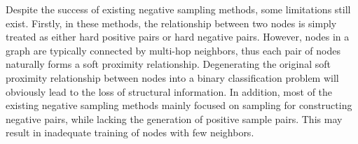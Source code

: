 Despite the success of existing negative sampling methods, some limitations still exist. 
Firstly, in these methods, the relationship between two nodes is simply treated as either hard positive pairs or hard negative pairs.
However, nodes in a graph are typically connected by multi-hop neighbors, thus each pair of nodes naturally forms a soft proximity relationship.  Degenerating the original soft proximity relationship between nodes into a binary classification problem will obviously lead to the loss of structural information.
In addition, most of the existing negative sampling methods \cite{pinsage, dns, he2020lightgcn, wang2017irgan} mainly focused on sampling for constructing negative pairs, while lacking the generation of positive sample pairs. 
This may result in inadequate training of nodes with few neighbors.

